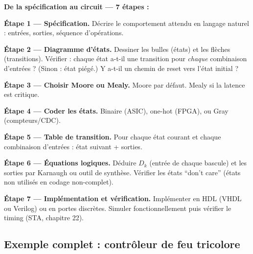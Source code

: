 \documentclass[12pt,a4paper,twoside]{book}
\begin{document}
\begin{pratique}
\textbf{De la spécification au circuit --- 7 étapes :}

\textbf{Étape 1 --- Spécification.}
Décrire le comportement attendu en langage naturel : entrées, sorties, séquence d'opérations.

\textbf{Étape 2 --- Diagramme d'états.}
Dessiner les bulles (états) et les flèches (transitions). Vérifier : chaque état a-t-il une transition pour \textit{chaque} combinaison d'entrées ? (Sinon : état piégé.) Y a-t-il un chemin de reset vers l'état initial ?

\textbf{Étape 3 --- Choisir Moore ou Mealy.}
Moore par défaut. Mealy si la latence est critique.

\textbf{Étape 4 --- Coder les états.}
Binaire (ASIC), one-hot (FPGA), ou Gray (compteurs/CDC).

\textbf{Étape 5 --- Table de transition.}
Pour chaque état courant et chaque combinaison d'entrées : état suivant + sorties.

\textbf{Étape 6 --- Équations logiques.}
Déduire $D_k$ (entrée de chaque bascule) et les sorties par Karnaugh ou outil de synthèse. Vérifier les états ``don't care'' (états non utilisés en codage non-complet).

\textbf{Étape 7 --- Implémentation et vérification.}
Implémenter en HDL (VHDL ou Verilog) ou en portes discrètes. Simuler fonctionnellement puis vérifier le timing (STA, chapitre 22).
\end{pratique}

\subsection{Exemple complet : contrôleur de feu tricolore}
\end{document}
